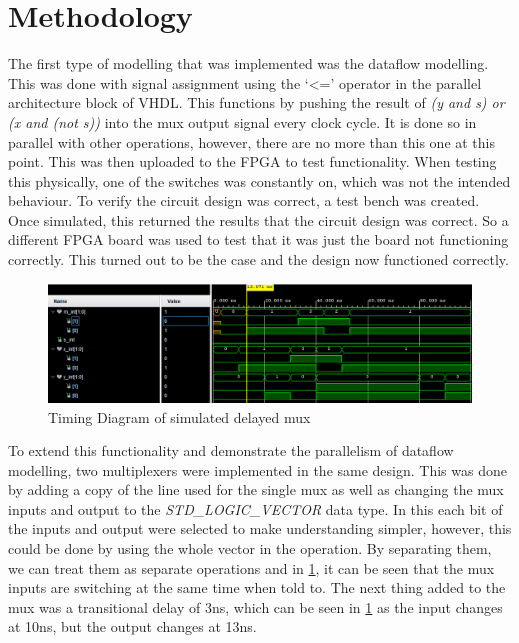 \documentclass[a4paper, 12pt]{article}
\begin{document}
	\section{Methodology}
		The first type of modelling that was implemented was the dataflow modelling. This was done with signal assignment using the `<=' operator in the parallel architecture block of VHDL. This functions by pushing the result of \textit{(y and s) or (x and (not s))} into the mux output signal every clock cycle. It is done so in parallel with other operations, however, there are no more than this one at this point. This was then uploaded to the FPGA to test functionality. When testing this physically, one of the switches was constantly on, which was not the intended behaviour. To verify the circuit design was correct, a test bench was created. Once simulated, this returned the results that the circuit design was correct. So a different FPGA board was used to test that it was just the board not functioning correctly. This turned out to be the case and the design now functioned correctly.
		\par
		\begin{figure}[!ht]
			\centering
			\includegraphics[width=0.8\columnwidth]{dataflow_modelling_delay.PNG}
			\caption{Timing Diagram of simulated delayed mux}
			\label{fig:delay}
		\end{figure}
		To extend this functionality and demonstrate the parallelism of dataflow modelling, two multiplexers were implemented in the same design. This was done by adding a copy of the line used for the single mux as well as changing the mux inputs and output to the \textit{STD\_LOGIC\_VECTOR} data type. In this each bit of the inputs and output were selected to make understanding simpler, however, this could be done by using the whole vector in the operation. By separating them, we can treat them as separate operations and in \cref{fig:delay}, it can be seen that the mux inputs are switching at the same time when told to. The next thing added to the mux was a transitional delay of 3ns, which can be seen in \cref{fig:delay} as the input changes at 10ns, but the output changes at 13ns.
		\par
\end{document}
